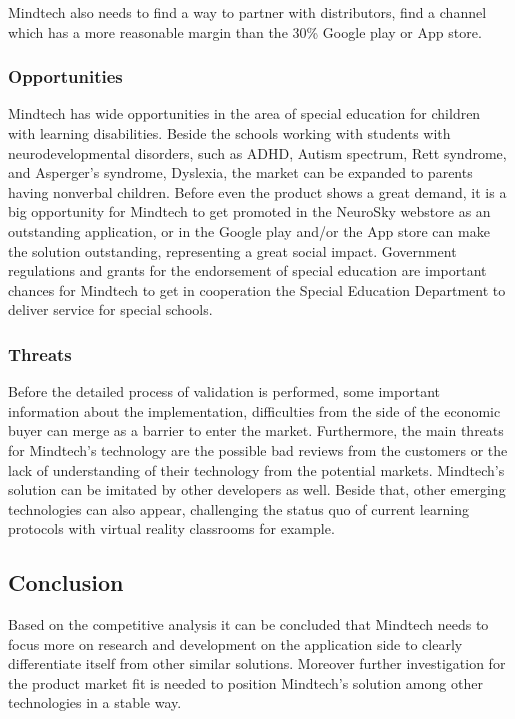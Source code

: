 \documentclass[letterpaper,10pt]{article}
\let\oldsubsection\subsection
\renewcommand{\subsection}{\def\cursectioning{subsection}\oldsubsection}
\begin{document}
Mindtech also needs to find a way to partner with distributors, find a channel which has a more reasonable margin than the 30\% Google play or App store. 

\subsubsection{Opportunities}

Mindtech has wide opportunities in the area of special education for children with learning disabilities. Beside the schools working with students with neurodevelopmental disorders, such as ADHD, Autism spectrum, Rett syndrome, and Asperger’s syndrome, Dyslexia, the market can be expanded to parents having nonverbal children.
Before even the product shows a great demand, it is a big opportunity for Mindtech to get promoted in the NeuroSky webstore as an outstanding application, or in the Google play and/or the App store can make the solution outstanding, representing a great social impact.
Government regulations and grants for the endorsement of special education are important chances for Mindtech to get in cooperation the Special Education Department to deliver service for special schools. 

\subsubsection{Threats}

Before the detailed process of validation is performed, some important information about the implementation, difficulties from the side of the economic buyer can merge as a barrier to enter the market. Furthermore, the main threats for Mindtech's technology are the possible bad reviews from the customers or the lack of understanding of their technology from the potential markets. Mindtech's solution can be imitated by other developers as well. Beside that, other emerging technologies can also appear, challenging the status quo of current learning protocols with virtual reality classrooms for example.




\subsection{Conclusion}

Based on the competitive analysis it can be concluded that Mindtech needs to focus more on research and development on the application side to clearly differentiate itself from other similar solutions. Moreover further investigation for the product market fit is needed to position Mindtech's solution among other technologies in a stable way. 
\end{document}
